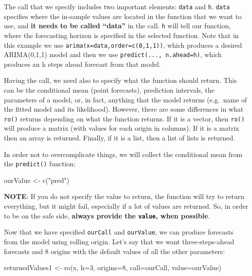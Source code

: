 \documentclass[
]{book}
\newenvironment{Shaded}{\begin{snugshade}}{\end{snugshade}}
\newcommand{\AttributeTok}[1]{\textcolor[rgb]{0.77,0.63,0.00}{#1}}
\newcommand{\DecValTok}[1]{\textcolor[rgb]{0.00,0.00,0.81}{#1}}
\newcommand{\FunctionTok}[1]{\textcolor[rgb]{0.00,0.00,0.00}{#1}}
\newcommand{\NormalTok}[1]{#1}
\newcommand{\OtherTok}[1]{\textcolor[rgb]{0.56,0.35,0.01}{#1}}
\newcommand{\StringTok}[1]{\textcolor[rgb]{0.31,0.60,0.02}{#1}}
\theoremstyle{definition}
\theoremstyle{definition}
\theoremstyle{definition}
\theoremstyle{definition}
\theoremstyle{remark}
\begin{document}
The call that we specify includes two important elements: \texttt{data} and \texttt{h}. \texttt{data} specifies where the in-sample values are located in the function that we want to use, and \textbf{it needs to be called ``data''} in the call. \texttt{h} will tell our function, where the forecasting horizon is specified in the selected function. Note that in this example we use \texttt{arima(x=data,order=c(0,1,1))}, which produces a desired ARIMA(0,1,1) model and then we use \texttt{predict(...,\ n.ahead=h)}, which produces an h steps ahead forecast from that model.

Having the call, we need also to specify what the function should return. This can be the conditional mean (point forecasts), prediction intervals, the parameters of a model, or, in fact, anything that the model returns (e.g.~name of the fitted model and its likelihood). However, there are some differences in what \texttt{ro()} returns depending on what the function returns. If it is a vector, then \texttt{ro()} will produce a matrix (with values for each origin in columns). If it is a matrix then an array is returned. Finally, if it is a list, then a list of lists is returned.

In order not to overcomplicate things, we will collect the conditional mean from the \texttt{predict()} function:

\begin{Shaded}
\begin{Highlighting}[]
\NormalTok{ourValue }\OtherTok{\textless{}{-}} \FunctionTok{c}\NormalTok{(}\StringTok{"pred"}\NormalTok{)}
\end{Highlighting}
\end{Shaded}

\textbf{NOTE}: If you do not specify the value to return, the function will try to return everything, but it might fail, especially if a lot of values are returned. So, in order to be on the safe side, \textbf{always provide the \texttt{value}, when possible}.

Now that we have specified \texttt{ourCall} and \texttt{ourValue}, we can produce forecasts from the model using rolling origin. Let's say that we want three-steps-ahead forecasts and 8 origins with the default values of all the other parameters:

\begin{Shaded}
\begin{Highlighting}[]
\NormalTok{returnedValues1 }\OtherTok{\textless{}{-}} \FunctionTok{ro}\NormalTok{(x, }\AttributeTok{h=}\DecValTok{3}\NormalTok{, }\AttributeTok{origins=}\DecValTok{8}\NormalTok{,}
                      \AttributeTok{call=}\NormalTok{ourCall, }\AttributeTok{value=}\NormalTok{ourValue)}
\end{Highlighting}
\end{Shaded}
\end{document}
